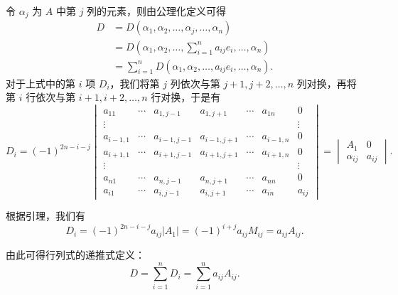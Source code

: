 \begin{exercise}
\begin{exgroup}
\begin{answer}
\begin{enumerate}
                    令 $\alpha_j$ 为 $A$ 中第 $j$ 列的元素，则由公理化定义可得
                    \begin{align*}
                        D &= D(\alpha_1, \alpha_2, \ldots, \alpha_j, \ldots, \alpha_n) \\
                          &= D(\alpha_1, \alpha_2, \ldots, \sum_{i=1}^n a_{ij} e_i, \ldots, \alpha_n) \\
                          &= \sum_{i=1}^n D(\alpha_1, \alpha_2, \ldots, a_{ij} e_i, \ldots, \alpha_n).
                    \end{align*}
                    对于上式中的第 $i$ 项 $D_i$，我们将第 $j$ 列依次与第 $j+1, j+2, \ldots, n$ 列对换，再将第 $i$ 行依次与第 $i+1, i+2, \ldots, n$ 行对换，于是有
                    \[
                        D_i = (-1)^{2n-i-j} \begin{vmatrix}
                            a_{11}     & \cdots & a_{1, j-1}   & a_{1, j+1}   & \cdots & a_{1n}     & 0      \\
                            \vdots     &        &              &              &        &            & \vdots \\
                            a_{i-1, 1} & \cdots & a_{i-1, j-1} & a_{i-1, j+1} & \cdots & a_{i-1, n} & 0      \\
                            a_{i+1, 1} & \cdots & a_{i+1, j-1} & a_{i+1, j+1} & \cdots & a_{i+1, n} & 0      \\
                            \vdots     &        &              &              &        &            & \vdots \\
                            a_{n1}     & \cdots & a_{n, j-1}   & a_{n, j+1}   & \cdots & a_{nn}     & 0      \\
                            a_{i1}     & \cdots & a_{i, j-1}   & a_{i, j+1}   & \cdots & a_{in}     & a_{ij}
                        \end{vmatrix} = \begin{vmatrix}
                            A_1         & 0      \\
                            \alpha_{ij} & a_{ij}
                        \end{vmatrix}.
                    \]

                    根据引理，我们有
                    \[
                        D_i = (-1)^{2n-i-j} a_{ij} |A_1| = (-1)^{i+j} a_{ij} M_{ij} = a_{ij} A_{ij}.
                    \]

                    由此可得行列式的递推式定义：
                    \[
                        D = \sum_{i=1}^n D_i = \sum_{i=1}^n a_{ij} A_{ij}.
                    \]


\end{enumerate}
\end{answer}
\end{exgroup}
\end{exercise}
